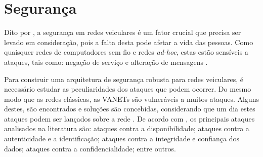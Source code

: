 \documentclass[
	12pt,				%
	oneside,			%
	a4paper,			%
	english,			%
	brazil				%
	]{abntex2ppgsi}
\begin{document}


\section{Segurança}

Dito por , a segurança em redes veiculares é um fator crucial que precisa ser levado em consideração, pois a falta desta pode afetar a vida das pessoas. Como quaisquer redes de computadores sem fio e redes \textit{ad-hoc}, estas estão sensíveis a ataques, tais como: 	negação de serviço e alteração de mensagens \cite{raya2006securing}.

Para construir uma arquitetura de segurança robusta para redes veiculares, é necessário estudar as peculiaridades dos ataques que podem ocorrer. Do mesmo modo que as redes clássicas, as VANETs são vulneráveis a muitos ataques. Alguns destes, são encontrados e soluções são concebidas, considerando que um dia estes ataques podem ser lançados sobre a rede \cite{engoulou2014vanet}. De acordo com ,  os principais ataques analisados na literatura são: ataques contra a disponibilidade; ataques contra a autenticidade e a identificação; ataques contra a integridade e confiança dos dados; ataques contra a confidencialidade; entre outros.
\end{document}

